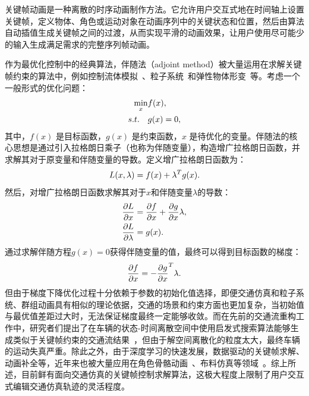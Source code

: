 关键帧动画是一种离散的时序动画制作方法。它允许用户交互式地在时间轴上设置关键帧，定义物体、角色或运动对象在动画序列中的关键状态和位置，然后由算法自动插值生成关键帧之间的过渡，从而实现平滑的动画效果，让用户使用尽可能少的输入生成满足需求的完整序列帧动画。

作为最优化控制中的经典算法，伴随法（adjoint method）被大量运用在求解关键帧约束的算法中，例如控制流体模拟~\cite{mcnamara2004fluid}、粒子系统~\cite{wojtan2006keyframe}和弹性物体形变~\cite{li2013interactive}等。考虑一个一般形式的优化问题：%
\begin{equation}
\setlength\abovedisplayskip{10pt}
\setlength\belowdisplayskip{10pt}
\begin{aligned}
    \min_{x}&f(x), \\
    s.t. \quad &g(x)=0,
\end{aligned}
\label{eq:intro_adjoint1}
\end{equation}
其中，$f(x)$ 是目标函数，$g(x)$ 是约束函数，$x$ 是待优化的变量。伴随法的核心思想是通过引入拉格朗日乘子（也称为伴随变量），构造增广拉格朗日函数，并求解其对于原变量和伴随变量的导数。定义增广拉格朗日函数为：
\begin{equation}
\setlength\abovedisplayskip{10pt}
\setlength\belowdisplayskip{10pt}
    L(x, \lambda) = f(x) + \lambda^T g(x).
\label{eq:intro_adjoint2}
\end{equation}
然后，对增广拉格朗日函数求解其对于$x$和伴随变量$\lambda$的导数：
\begin{equation}
\setlength\abovedisplayskip{10pt}
\setlength\belowdisplayskip{10pt}
\begin{aligned}
    \frac{\partial L}{\partial x} &= \frac{\partial f}{\partial x} + \frac{\partial g}{\partial x} \lambda, \\
    \frac{\partial L}{\partial \lambda} &= g(x).
\end{aligned}
\label{eq:intro_adjoint3}
\end{equation}
通过求解伴随方程$g(x) = 0$获得伴随变量的值，最终可以得到目标函数的梯度：
\begin{equation}
\setlength\abovedisplayskip{10pt}
\setlength\belowdisplayskip{10pt}
    \frac{\partial f}{\partial x} = - \frac{\partial g}{\partial x}^T \lambda.
\label{eq:intro_adjoint4}
\end{equation}
但由于梯度下降优化过程十分依赖于参数的初始化值选择，即便交通仿真和粒子系统、群组动画具有相似的理论依据，交通的场景和约束方面也更加复杂，当初始值与最优值差距过大时，无法保证梯度最终一定能够收敛。而在先前的交通流重构工作中，研究者们提出了在车辆的状态-时间离散空间中使用启发式搜索算法能够生成类似于关键帧约束的交通流结果~\cite{van2007kinodynamic, sewall2010virtualized}，但由于解空间离散化的粒度太大，最终车辆的运动失真严重。除此之外，由于深度学习的快速发展，数据驱动的关键帧求解、动画补全等，近年来也被大量应用在角色骨骼动画~\cite{xu2018weighted, harvey2020robust, tang2022real}、布料仿真等领域~\cite{wang2019learning}。综上所述，目前鲜有面向交通仿真的关键帧控制求解算法，这极大程度上限制了用户交互式编辑交通仿真轨迹的灵活程度。



